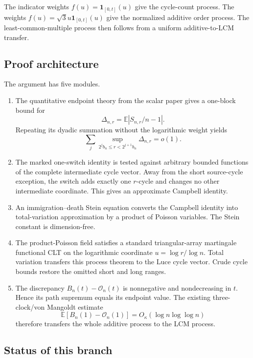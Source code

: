 \documentclass[11pt]{article}
\theoremstyle{definition}
\theoremstyle{remark}
\newcommand{\Ee}{\mathbb E}
\newcommand{\one}{\mathbf 1}
\newcommand{\cO}{\mathcal O}
\begin{document}
The indicator weights $f(u)=\one_{[0,t]}(u)$ give the cycle-count process.
The weights $f(u)=\sqrt3u\one_{[0,t]}(u)$ give the normalized additive order
process.  The least-common-multiple process then follows from a uniform
additive-to-LCM transfer.

\subsection*{Proof architecture}

The argument has five modules.

\begin{enumerate}[label=\textnormal{(\roman*)},leftmargin=2.4em]
\item The quantitative endpoint theory from the scalar paper gives a
one-block bound for
\[
 \Delta_{n,r}=\Ee\left|S_{n,r}/n-1\right|.
\]
Repeating its dyadic summation without the logarithmic weight yields
\[
 \sum_j\sup_{2^jb_n\le r<2^{j+1}b_n}\Delta_{n,r}=o(1).
\]

\item The marked one-switch identity is tested against arbitrary bounded
functions of the complete intermediate cycle vector.  Away from the short
source-cycle exception, the switch adds exactly one $r$-cycle and changes no
other intermediate coordinate.  This gives an approximate Campbell identity.

\item An immigration--death Stein equation converts the Campbell identity
into total-variation approximation by a product of Poisson variables.  The
Stein constant is dimension-free.

\item The product-Poisson field satisfies a standard triangular-array
martingale functional CLT on the logarithmic coordinate
$u=\log r/\log n$.  Total variation transfers this process theorem to the
Luce cycle vector.  Crude cycle bounds restore the omitted short and long
ranges.

\item The discrepancy $B_n(t)-\cO_n(t)$ is nonnegative and nondecreasing in
$t$.  Hence its path supremum equals its endpoint value.  The existing
three-clock/von Mangoldt estimate
\[
 \Ee[B_n(1)-\cO_n(1)]=O_\kappa(\log n\log\log n)
\]
therefore transfers the whole additive process to the LCM process.
\end{enumerate}

\subsection*{Status of this branch}
\end{document}
